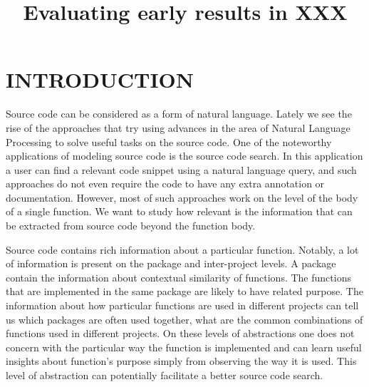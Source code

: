 \documentclass[a4paper,twoside]{article}
\begin{document}
\title{Evaluating early results in XXX}

\author{
}

\keywords{}


\onecolumn \maketitle \normalsize \setcounter{footnote}{0} \vfill

\section{\uppercase{Introduction}}
Source code can be considered as a form of natural language. Lately we see the rise of the approaches that try using advances in the area of Natural Language Processing to solve useful tasks on the source code. One of the noteworthy applications of modeling source code is the source code search. In this application a user can find a relevant code snippet using a natural language query, and such approaches do not even require the code to have any extra annotation or documentation. However, most of such approaches work on the level of the body of a single function. We want to study how relevant is the information that can be extracted from source code beyond the function body. 

Source code contains rich information about a particular function. Notably, a lot of information is present on the package and inter-project levels. A package contain the information about contextual similarity of functions. The functions that are implemented in the same package are likely to have related purpose. The information about how particular functions are used in different projects can tell us which packages are often used together, what are the common combinations of functions used in different projects. On these levels of abstractions one does not concern with the particular way the function is implemented and can learn useful insights about function's purpose simply from observing the way it is used. This level of abstraction can potentially facilitate a better source code search. 
\end{document}
